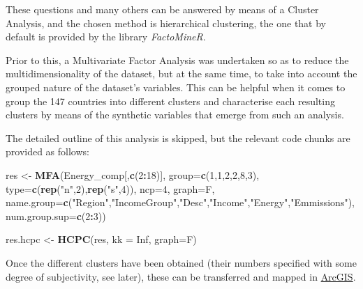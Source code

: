 \documentclass[]{article}
\newenvironment{Shaded}{\begin{snugshade}}{\end{snugshade}}
\newcommand{\KeywordTok}[1]{\textcolor[rgb]{0.13,0.29,0.53}{\textbf{#1}}}
\newcommand{\DataTypeTok}[1]{\textcolor[rgb]{0.13,0.29,0.53}{#1}}
\newcommand{\DecValTok}[1]{\textcolor[rgb]{0.00,0.00,0.81}{#1}}
\newcommand{\StringTok}[1]{\textcolor[rgb]{0.31,0.60,0.02}{#1}}
\newcommand{\OtherTok}[1]{\textcolor[rgb]{0.56,0.35,0.01}{#1}}
\newcommand{\OperatorTok}[1]{\textcolor[rgb]{0.81,0.36,0.00}{\textbf{#1}}}
\newcommand{\NormalTok}[1]{#1}
\begin{document}
These questions and many others can be answered by means of a Cluster
Analysis, and the chosen method is hierarchical clustering, the one that
by default is provided by the library \emph{FactoMineR}.

Prior to this, a Multivariate Factor Analysis was undertaken so as to
reduce the multidimensionality of the dataset, but at the same time, to
take into account the grouped nature of the dataset's variables. This
can be helpful when it comes to group the 147 countries into different
clusters and characterise each resulting clusters by means of the
synthetic variables that emerge from such an analysis.

The detailed outline of this analysis is skipped, but the relevant code
chunks are provided as follows:

\begin{Shaded}
\begin{Highlighting}[]
\NormalTok{res <-}\StringTok{ }\KeywordTok{MFA}\NormalTok{(Energy_comp[,}\KeywordTok{c}\NormalTok{(}\DecValTok{2}\OperatorTok{:}\DecValTok{18}\NormalTok{)], }\DataTypeTok{group=}\KeywordTok{c}\NormalTok{(}\DecValTok{1}\NormalTok{,}\DecValTok{1}\NormalTok{,}\DecValTok{2}\NormalTok{,}\DecValTok{2}\NormalTok{,}\DecValTok{8}\NormalTok{,}\DecValTok{3}\NormalTok{), }\DataTypeTok{type=}\KeywordTok{c}\NormalTok{(}\KeywordTok{rep}\NormalTok{(}\StringTok{"n"}\NormalTok{,}\DecValTok{2}\NormalTok{),}\KeywordTok{rep}\NormalTok{(}\StringTok{"s"}\NormalTok{,}\DecValTok{4}\NormalTok{)),}
           \DataTypeTok{ncp=}\DecValTok{4}\NormalTok{, }\DataTypeTok{graph=}\NormalTok{F, }\DataTypeTok{name.group=}\KeywordTok{c}\NormalTok{(}\StringTok{"Region"}\NormalTok{,}\StringTok{"IncomeGroup"}\NormalTok{,}\StringTok{"Desc"}\NormalTok{,}\StringTok{"Income"}\NormalTok{,}\StringTok{"Energy"}\NormalTok{,}\StringTok{"Emmissions"}\NormalTok{),}
           \DataTypeTok{num.group.sup=}\KeywordTok{c}\NormalTok{(}\DecValTok{2}\OperatorTok{:}\DecValTok{3}\NormalTok{))}
\end{Highlighting}
\end{Shaded}

\begin{Shaded}
\begin{Highlighting}[]
\NormalTok{res.hcpc <-}\StringTok{ }\KeywordTok{HCPC}\NormalTok{(res, }\DataTypeTok{kk =} \OtherTok{Inf}\NormalTok{, }\DataTypeTok{graph=}\NormalTok{F)}
\end{Highlighting}
\end{Shaded}

Once the different clusters have been obtained (their numbers specified
with some degree of subjectivity, see later), these can be transferred
and mapped in
\href{https://sanktpetriskole.maps.arcgis.com/apps/View/index.html?appid=39999e464aa94b528d7eb0d2c5543561}{ArcGIS}.
\end{document}
